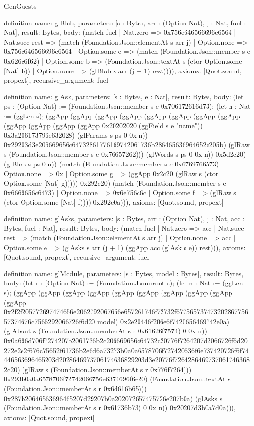 \begin{lexlean}{GenGuests}
\begin{semanticmodule}
definition{
  name: glBlob,
  parameters: [s : Bytes, arr : (Option Nat), j : Nat, fuel : Nat],
  result: Bytes,
  body: (match fuel
    | Nat.zero => 0x756e646566696e6564
    | Nat.succ rest => (match (Foundation.Json::elementAt s arr j)
      | Option.none => 0x756e646566696e6564
      | Option.some e => (match (Foundation.Json::member s e 0x626c6f62)
        | Option.some b => (Foundation.Json::textAt s (ctor Option.some [Nat] b))
        | Option.none => (glBlob s arr (j + 1) rest)))),
  axioms: [Quot.sound, propext],
  recursive_argument: fuel
}

definition{
  name: glAsk,
  parameters: [s : Bytes, e : Nat],
  result: Bytes,
  body: (let ps : (Option Nat) := (Foundation.Json::member s e 0x706172616d73); (let n : Nat := (ggLen s); (ggApp (ggApp (ggApp (ggApp (ggApp (ggApp (ggApp (ggApp (ggApp (ggApp (ggApp (ggApp 0x20202020 (ggField s e "name")) 0x3a206173796e632028) (glParams s ps 0 0x n)) 0x29203d3e206669656c64732861776169742061736b286465636964652c205b) (glRaw s (Foundation.Json::member s e 0x76657262))) (glWords s ps 0 0x n)) 0x5d2c20) (glBlob s ps 0 n)) (match (Foundation.Json::member s e 0x6769766573)
    | Option.none => 0x
    | Option.some g => (ggApp 0x2c20 (glRaw s (ctor Option.some [Nat] g))))) 0x292c20) (match (Foundation.Json::member s e 0x6669656c6473)
    | Option.none => 0x6e756c6c
    | Option.some f => (glRaw s (ctor Option.some [Nat] f)))) 0x292c0a))),
  axioms: [Quot.sound, propext]
}

definition{
  name: glAsks,
  parameters: [s : Bytes, arr : (Option Nat), j : Nat, acc : Bytes, fuel : Nat],
  result: Bytes,
  body: (match fuel
    | Nat.zero => acc
    | Nat.succ rest => (match (Foundation.Json::elementAt s arr j)
      | Option.none => acc
      | Option.some e => (glAsks s arr (j + 1) (ggApp acc (glAsk s e)) rest))),
  axioms: [Quot.sound, propext],
  recursive_argument: fuel
}

definition{
  name: glModule,
  parameters: [s : Bytes, model : Bytes],
  result: Bytes,
  body: (let r : (Option Nat) := (Foundation.Json::root s); (let n : Nat := (ggLen s); (ggApp (ggApp (ggApp (ggApp (ggApp (ggApp (ggApp (ggApp (ggApp (ggApp 0x2f2f205772697474656e2062792067656e657261746f72732f67756573747320286775657374676c7565292066726f6d20 model) 0x2e20446f206e6f7420656469742e0a) (glAbout s (Foundation.Json::memberAt s r 0x61626f7574) 0 0x n)) 0x0a696d706f7274207b2061736b2c206669656c64732c20776f7264207d2066726f6d20272e2e2f676c75652f61736b2e6d6a73273b0a0a6578706f727420636f6e737420726f6f74446563696465203d2028646973706174636829203d3e20776f72642864697370617463682c20) (glRaw s (Foundation.Json::memberAt s r 0x776f7264))) 0x293b0a0a6578706f72742066756e6374696f6e20) (Foundation.Json::textAt s (Foundation.Json::memberAt s r 0x6d616b65))) 0x287b20646563696465207d29207b0a202072657475726e207b0a) (glAsks s (Foundation.Json::memberAt s r 0x61736b73) 0 0x n)) 0x20207d3b0a7d0a))),
  axioms: [Quot.sound, propext]
}


\end{semanticmodule}
\end{lexlean}
